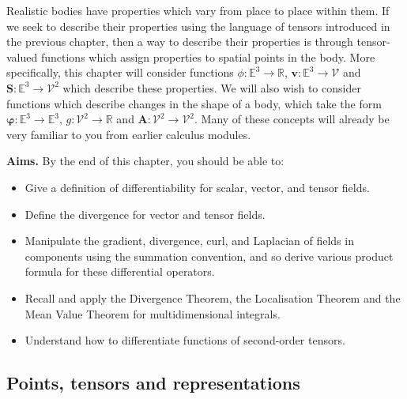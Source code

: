 \documentclass[
  letterpaper,
  DIV=11,
  numbers=noendperiod]{scrreprt}
\theoremstyle{plain}
\theoremstyle{remark}
\begin{document}
Realistic bodies have properties which vary from place to place within
them. If we seek to describe their properties using the language of
tensors introduced in the previous chapter, then a way to describe their
properties is through tensor-valued functions which assign properties to
spatial points in the body. More specifically, this chapter will
consider functions \(\phi:{\mathbb{E}}^3\to{\mathbb{R}}\),
\({\boldsymbol{v}}:{\mathbb{E}}^3\to{\mathcal{V}}\) and
\({\boldsymbol{S}}:{\mathbb{E}}^3\to{\mathcal{V}}^2\) which describe
these properties. We will also wish to consider functions which describe
changes in the shape of a body, which take the form
\({\boldsymbol{\varphi}}:{\mathbb{E}}^3\to{\mathbb{E}}^3\),
\(g:{\mathcal{V}}^2\to{\mathbb{R}}\) and
\({\boldsymbol{A}}:{\mathcal{V}}^2\to{\mathcal{V}}^2\). Many of these
concepts will already be very familiar to you from earlier calculus
modules.

\textbf{Aims.} By the end of this chapter, you should be able to:

\begin{itemize}
\item
  Give a definition of differentiability for scalar, vector, and tensor
  fields.
\item
  Define the divergence for vector and tensor fields.
\item
  Manipulate the gradient, divergence, curl, and Laplacian of fields in
  components using the summation convention, and so derive various
  product formula for these differential operators.
\item
  Recall and apply the Divergence Theorem, the Localisation Theorem and
  the Mean Value Theorem for multidimensional integrals.
\item
  Understand how to differentiate functions of second-order tensors.
\end{itemize}

\subsection{Points, tensors and
representations}\label{points-tensors-and-representations}
\end{document}
